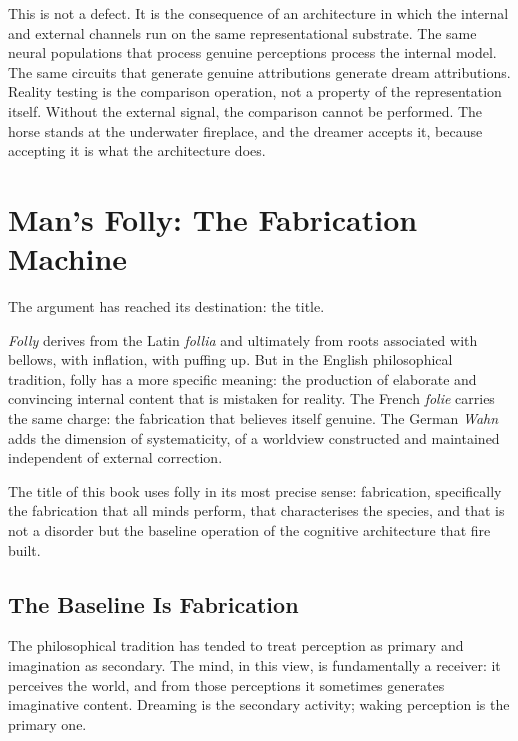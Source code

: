 This is not a defect. It is the consequence of an architecture in which the internal and external channels run on the same representational substrate. The same neural populations that process genuine perceptions process the internal model. The same circuits that generate genuine attributions generate dream attributions. Reality testing is the comparison operation, not a property of the representation itself. Without the external signal, the comparison cannot be performed. The horse stands at the underwater fireplace, and the dreamer accepts it, because accepting it is what the architecture does.

\bigskip

\section{Man's Folly: The Fabrication Machine}

The argument has reached its destination: the title.

\textit{Folly} derives from the Latin \textit{follia} and ultimately from roots associated with bellows, with inflation, with puffing up. But in the English philosophical tradition, folly has a more specific meaning: the production of elaborate and convincing internal content that is mistaken for reality. The French \textit{folie} carries the same charge: the fabrication that believes itself genuine. The German \textit{Wahn} adds the dimension of systematicity, of a worldview constructed and maintained independent of external correction.

The title of this book uses folly in its most precise sense: fabrication, specifically the fabrication that all minds perform, that characterises the species, and that is not a disorder but the baseline operation of the cognitive architecture that fire built.

\subsection{The Baseline Is Fabrication}

The philosophical tradition has tended to treat perception as primary and imagination as secondary. The mind, in this view, is fundamentally a receiver: it perceives the world, and from those perceptions it sometimes generates imaginative content. Dreaming is the secondary activity; waking perception is the primary one.

